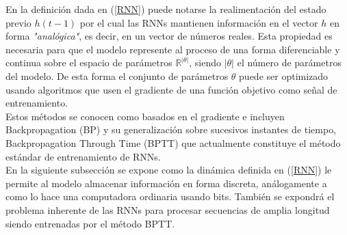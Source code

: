 \documentclass{article}
\begin{document}
	En la definición dada en (\ref{RNN}) puede notarse la realimentación del estado previo $h(t-1)$ por el cual las RNNs mantienen información en el vector $h$ en forma \textit{"analógica"}, es decir, en un vector de números reales. Esta propiedad es necesaria para que el modelo represente al proceso de una forma diferenciable y continua sobre el espacio de parámetros $\mathbb{R}^{|\theta|}$, siendo $|\theta|$ el número de parámetros del modelo. 
	De esta forma el conjunto de parámetros $\theta$ puede ser optimizado usando algoritmos que usen el gradiente de una función objetivo como señal de entrenamiento. \\
	Estos métodos se conocen como basados en el gradiente\cite{20SutskeverPhdThesis} e incluyen Backpropagation (BP) y su generalización sobre sucesivos instantes de tiempo, Backpropagation Through Time (BPTT) que actualmente constituye el método estándar de entrenamiento de RNNs.\\
	
	En la siguiente subsección se expone como la dinámica definida en (\ref{RNN}) le permite al modelo almacenar información en forma discreta, análogamente a como lo hace una computadora ordinaria usando bits. También se expondrá el problema inherente de las RNNs para procesar secuencias de amplia longitud siendo entrenadas por el método BPTT.\\
	
\end{document}
